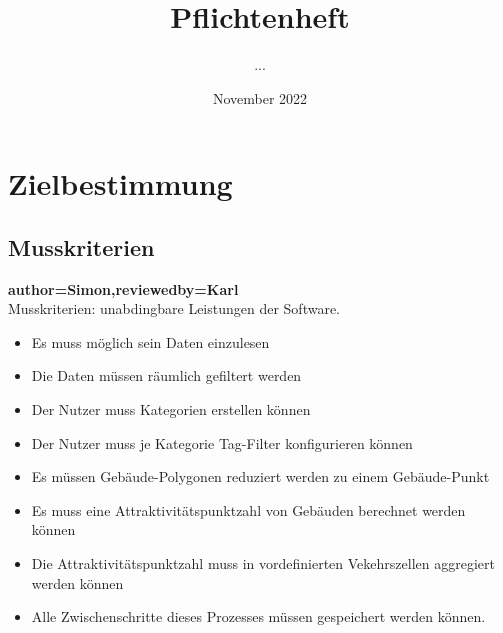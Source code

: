 \documentclass[parskip=full]{scrartcl} %
\title{Pflichtenheft}
\author{...}
\date{November 2022}
\begin{document}
\maketitle
\newpage

\tableofcontents
\newpage




\section{Zielbestimmung}

\subsection{Musskriterien}
\textbf{author=Simon,reviewedby=Karl\\}
Musskriterien: unabdingbare Leistungen der Software.
\begin{itemize}
    \item Es muss möglich sein Daten einzulesen
    \item Die Daten müssen räumlich gefiltert werden
    \item Der Nutzer muss Kategorien erstellen können
    \item Der Nutzer muss je Kategorie Tag-Filter konfigurieren können
    \item Es müssen Gebäude-Polygonen reduziert werden zu einem Gebäude-Punkt
    \item Es muss eine Attraktivitätspunktzahl von Gebäuden berechnet werden können
    \item Die Attraktivitätspunktzahl muss in vordefinierten Vekehrszellen aggregiert werden können 
    \item Alle Zwischenschritte dieses Prozesses müssen gespeichert werden können.
\end{itemize}
\end{document}
